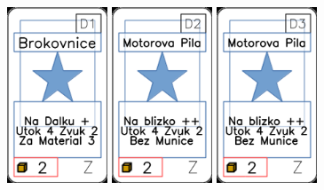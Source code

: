\documentclass[a4paper]{article}
\begin{document}
	\includegraphics[width=3.0cm]{img-1_105}
	\includegraphics[width=3.0cm]{img-1_106}
	\includegraphics[width=3.0cm]{img-1_107}
\end{document}

